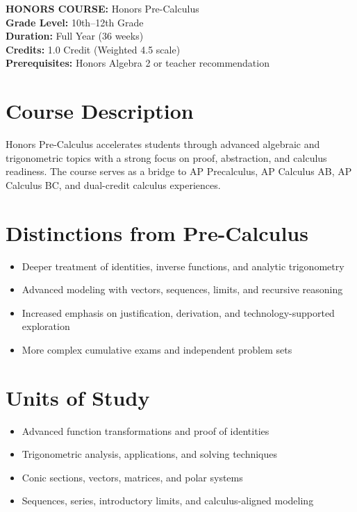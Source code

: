 \documentclass[12pt,oneside]{book}
\begin{document}
\noindent\textbf{HONORS COURSE:} Honors Pre-Calculus\\
\textbf{Grade Level:} 10th--12th Grade\\
\textbf{Duration:} Full Year (36 weeks)\\
\textbf{Credits:} 1.0 Credit (Weighted 4.5 scale)\\
\textbf{Prerequisites:} Honors Algebra 2 or teacher recommendation

\section{Course Description}
Honors Pre-Calculus accelerates students through advanced algebraic and trigonometric topics with a strong
focus on proof, abstraction, and calculus readiness. The course serves as a bridge to AP Precalculus,
AP Calculus AB, AP Calculus BC, and dual-credit calculus experiences.

\section{Distinctions from Pre-Calculus}
\begin{itemize}[leftmargin=2em]
    \item Deeper treatment of identities, inverse functions, and analytic trigonometry
    \item Advanced modeling with vectors, sequences, limits, and recursive reasoning
    \item Increased emphasis on justification, derivation, and technology-supported exploration
    \item More complex cumulative exams and independent problem sets
\end{itemize}

\section{Units of Study}
\begin{itemize}[leftmargin=2em]
    \item Advanced function transformations and proof of identities
    \item Trigonometric analysis, applications, and solving techniques
    \item Conic sections, vectors, matrices, and polar systems
    \item Sequences, series, introductory limits, and calculus-aligned modeling
\end{itemize}
\end{document}
